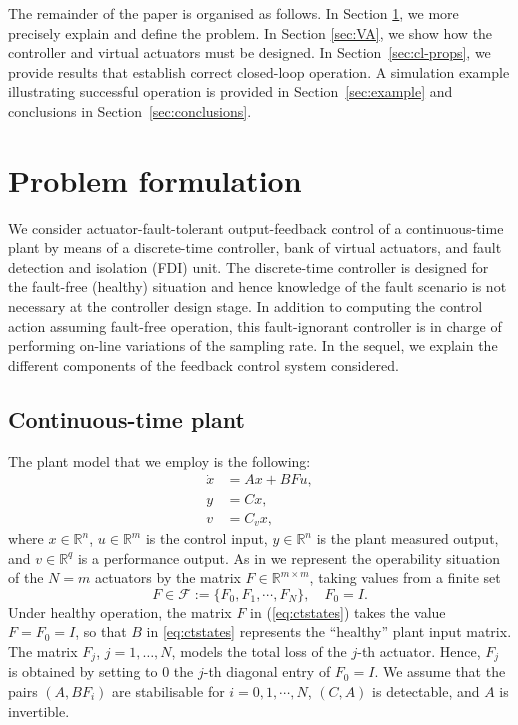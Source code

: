 \documentclass[letterpaper, 10 pt, conference]{ieeeconf}
\newcommand{\Rn}{\mathbb{R}^n}
\newcommand{\Rq}{\mathbb{R}^q}
\newcommand{\Rmm}{\mathbb{R}^{m\times m}}
\newcommand{\Rm}{\mathbb{R}^{m}}
\newcommand{\dfn}{:=}
\begin{document}
The remainder of the paper is organised as follows. In Section \ref{sec:probform}, we more precisely explain and define the problem. In Section \ref{sec:VA}, we show how the controller and virtual actuators must be designed. In Section~\ref{sec:cl-props}, we provide results that establish correct closed-loop operation. A simulation example illustrating successful operation is provided in Section~\ref{sec:example} and conclusions in Section~\ref{sec:conclusions}.


\section{Problem formulation}
\label{sec:probform}
We consider actuator-fault-tolerant output-feedback control of a
continuous-time plant by means of a discrete-time controller, bank of
virtual actuators, and fault detection and isolation (FDI) unit. The
discrete-time controller is designed for the fault-free (healthy)
situation and hence knowledge of the fault scenario is not necessary
at the controller design stage. In addition to computing the control
action assuming fault-free operation, this fault-ignorant controller
is in charge of performing on-line variations of the sampling rate. In
the sequel, we explain the different components of the feedback
control system considered.

\subsection{Continuous-time plant}
\label{sec:ct-plant}

The plant model that we employ is the following:
\begin{align}
\label{eq:ctstates}
  \dot{x} &= Ax+BF {u},\\
\label{eq:ctoutput}
  {y} &= Cx, \\ \label{eq:ctperformance}
  v &= C_vx,
\end{align}
where $x\in\Rn$, $u\in\Rm$ is the control input, $y\in\Rn$ is the
plant measured output, and $v\in\Rq$ is a performance output. As in
\cite{seron_bankVA_ifac11} we represent the operability situation of
the $N=m$ actuators by the matrix $F\in\Rmm$, taking values from a
finite set
\begin{equation}
  \label{eq:faults}
  F\in\mathcal{F}\dfn\{F_0,F_1,\cdots,F_N\},\quad F_0 = I.
\end{equation}
Under healthy operation, the matrix $F$ in (\ref{eq:ctstates}) takes
the value $F=F_0=I$, so that $B$ in \eqref{eq:ctstates} represents the
``healthy'' plant input matrix. The matrix $F_j$, $j=1,\ldots,N$,
models the total loss of the $j$-th actuator. Hence, $F_j$ is obtained
by setting to $0$ the $j$-th diagonal entry of $F_0=I$.  We assume that the pairs $(A,BF_i)$ are stabilisable for $i =
0,1,\cdots,N$, $(C,A)$ is detectable, and $A$ is invertible.
\end{document}

